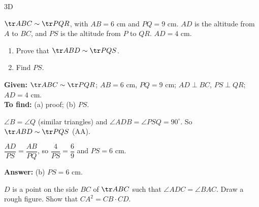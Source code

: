 \begin{exercise}{3D}
\item $\tr ABC\sim\tr PQR$, with $AB=6$ cm and $PQ=9$ cm. $AD$ is the altitude from $A$ to $BC$, and $PS$ is the altitude from $P$ to $QR$. $AD=4$ cm.
\begin{enumerate}[label=(\alph*),itemsep=1pt]
  \item Prove that $\tr ABD\sim\tr PQS$.
  \item Find $PS$.
\end{enumerate}
\begin{solution}
\textbf{Given:} $\tr ABC\sim\tr PQR$; $AB=6$ cm, $PQ=9$ cm; $AD\perp BC$, $PS\perp QR$; $AD=4$ cm.\\
\textbf{To find:} (a) proof; (b) $PS$.
\begin{steps}
  \item[(a)] $\angle B=\angle Q$ (similar triangles) and $\angle ADB=\angle PSQ=90^\circ$. So $\tr ABD\sim\tr PQS$ (AA).
  \item[(b)] $\dfrac{AD}{PS}=\dfrac{AB}{PQ}$, so $\dfrac{4}{PS}=\dfrac69$ and $PS=6$ cm.
\end{steps}
\textbf{Answer:} (b) $PS=6$ cm.
\end{solution}

\item $D$ is a point on the side $BC$ of $\tr ABC$ such that $\angle ADC=\angle BAC$. Draw a rough figure. Show that $CA^2=CB\cdot CD$.
\begin{solution}
\end{solution}


\end{exercise}
